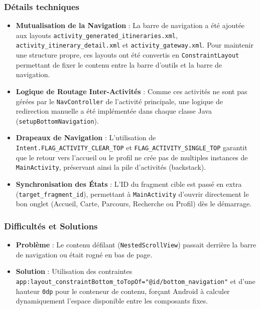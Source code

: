 \documentclass{article}
\begin{document}
\subsubsection{Détails techniques}
\begin{itemize}
    \item \textbf{Mutualisation de la Navigation} : La barre de navigation a été ajoutée aux layouts \texttt{activity\_generated\_itineraries.xml}, \texttt{activity\_itinerary\_detail.xml} et \texttt{activity\_gateway.xml}. Pour maintenir une structure propre, ces layouts ont été convertis en \texttt{ConstraintLayout} permettant de fixer le contenu entre la barre d'outils et la barre de navigation.
    \item \textbf{Logique de Routage Inter-Activités} : Comme ces activités ne sont pas gérées par le \texttt{NavController} de l'activité principale, une logique de redirection manuelle a été implémentée dans chaque classe Java (\texttt{setupBottomNavigation}). 
    \item \textbf{Drapeaux de Navigation} : L'utilisation de \texttt{Intent.FLAG\_ACTIVITY\_CLEAR\_TOP} et \texttt{FLAG\_ACTIVITY\_SINGLE\_TOP} garantit que le retour vers l'accueil ou le profil ne crée pas de multiples instances de \texttt{MainActivity}, préservant ainsi la pile d'activités (backstack).
    \item \textbf{Synchronisation des États} : L'ID du fragment cible est passé en extra (\texttt{target\_fragment\_id}), permettant à \texttt{MainActivity} d'ouvrir directement le bon onglet (Accueil, Carte, Parcours, Recherche ou Profil) dès le démarrage.
\end{itemize}

\subsubsection{Difficultés et Solutions}
\begin{itemize}
    \item \textbf{Problème} : Le contenu défilant (\texttt{NestedScrollView}) passait derrière la barre de navigation ou était rogné en bas de page.
    \item \textbf{Solution} : Utilisation des contraintes \texttt{app:layout\_constraintBottom\_toTopOf="@id/bottom\_navigation"} et d'une hauteur \texttt{0dp} pour le conteneur de contenu, forçant Android à calculer dynamiquement l'espace disponible entre les composants fixes.
\end{itemize}
\end{document}
